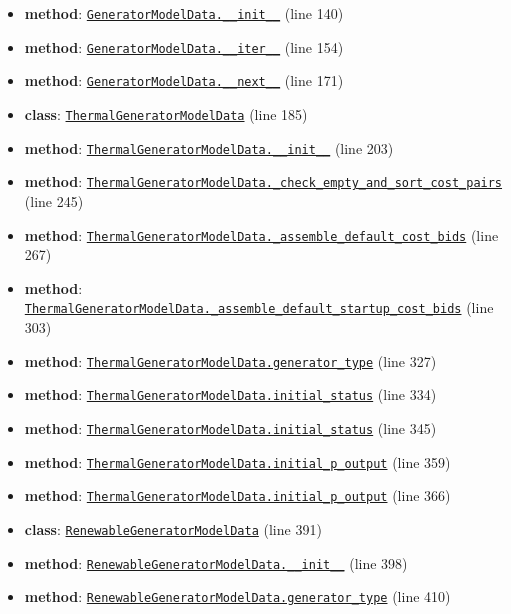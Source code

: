 \documentclass[11pt]{report}
\begin{document}
\begin{itemize}[leftmargin=*]
  \item \textbf{method}: \hyperref[def:model_data.py:GeneratorModelData.__init__:L140]{\texttt{GeneratorModelData.\_\_init\_\_}} (line 140)
  \item \textbf{method}: \hyperref[def:model_data.py:GeneratorModelData.__iter__:L154]{\texttt{GeneratorModelData.\_\_iter\_\_}} (line 154)
  \item \textbf{method}: \hyperref[def:model_data.py:GeneratorModelData.__next__:L171]{\texttt{GeneratorModelData.\_\_next\_\_}} (line 171)
  \item \textbf{class}: \hyperref[def:model_data.py:ThermalGeneratorModelData:L185]{\texttt{ThermalGeneratorModelData}} (line 185)
  \item \textbf{method}: \hyperref[def:model_data.py:ThermalGeneratorModelData.__init__:L203]{\texttt{ThermalGeneratorModelData.\_\_init\_\_}} (line 203)
  \item \textbf{method}: \hyperref[def:model_data.py:ThermalGeneratorModelData._check_empty_and_sort_cost_pairs:L245]{\texttt{ThermalGeneratorModelData.\_check\_empty\_and\_sort\_cost\_pairs}} (line 245)
  \item \textbf{method}: \hyperref[def:model_data.py:ThermalGeneratorModelData._assemble_default_cost_bids:L267]{\texttt{ThermalGeneratorModelData.\_assemble\_default\_cost\_bids}} (line 267)
  \item \textbf{method}: \hyperref[def:model_data.py:ThermalGeneratorModelData._assemble_default_startup_cost_bids:L303]{\texttt{ThermalGeneratorModelData.\_assemble\_default\_startup\_cost\_bids}} (line 303)
  \item \textbf{method}: \hyperref[def:model_data.py:ThermalGeneratorModelData.generator_type:L327]{\texttt{ThermalGeneratorModelData.generator\_type}} (line 327)
  \item \textbf{method}: \hyperref[def:model_data.py:ThermalGeneratorModelData.initial_status:L334]{\texttt{ThermalGeneratorModelData.initial\_status}} (line 334)
  \item \textbf{method}: \hyperref[def:model_data.py:ThermalGeneratorModelData.initial_status:L345]{\texttt{ThermalGeneratorModelData.initial\_status}} (line 345)
  \item \textbf{method}: \hyperref[def:model_data.py:ThermalGeneratorModelData.initial_p_output:L359]{\texttt{ThermalGeneratorModelData.initial\_p\_output}} (line 359)
  \item \textbf{method}: \hyperref[def:model_data.py:ThermalGeneratorModelData.initial_p_output:L366]{\texttt{ThermalGeneratorModelData.initial\_p\_output}} (line 366)
  \item \textbf{class}: \hyperref[def:model_data.py:RenewableGeneratorModelData:L391]{\texttt{RenewableGeneratorModelData}} (line 391)
  \item \textbf{method}: \hyperref[def:model_data.py:RenewableGeneratorModelData.__init__:L398]{\texttt{RenewableGeneratorModelData.\_\_init\_\_}} (line 398)
  \item \textbf{method}: \hyperref[def:model_data.py:RenewableGeneratorModelData.generator_type:L410]{\texttt{RenewableGeneratorModelData.generator\_type}} (line 410)
\end{itemize}
\end{document}
